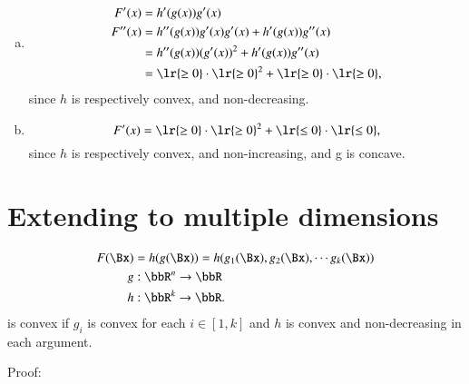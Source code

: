 \begin{enumerate}[(a)]
\item
\begin{equation}\label{eqn:convexOptimizationLecture8:180}
\begin{aligned}
F'(x) &= h'(g(x)) g'(x) \\
F''(x) &=
h''(g(x)) g'(x) g'(x)
+
h'(g(x)) g''(x) \\
&=
h''(g(x)) (g'(x))^2
+
h'(g(x)) g''(x) \\
&= 
\lr{ \ge 0 } \cdot \lr{ \ge 0 }^2 + \lr{ \ge 0 } \cdot \lr{ \ge 0 },
\end{aligned}
\end{equation}
%
since \( h \) is respectively convex, and non-decreasing.
\item
%
\begin{equation}\label{eqn:convexOptimizationLecture8:180b}
F'(x) = 
\lr{ \ge 0 } \cdot \lr{ \ge 0 }^2 + \lr{ \le 0 } \cdot \lr{ \le 0 },
\end{equation}
%
since \( h \) is respectively convex, and non-increasing, and g is concave.
\end{enumerate}

\section{Extending to multiple dimensions}
%
\begin{equation}\label{eqn:convexOptimizationLecture8:200}
\begin{aligned}
F(\Bx)
&= h(g(\Bx))
= h( g_1(\Bx), g_2(\Bx), \cdots g_k(\Bx) ) \\
g &: \bbR^n \rightarrow \bbR \\
h &: \bbR^k \rightarrow \bbR.
\end{aligned}
\end{equation}
%
is convex if \( g_i \) is convex for each \( i \in [1,k] \) and \( h \) is convex and non-decreasing in each argument.

Proof:

